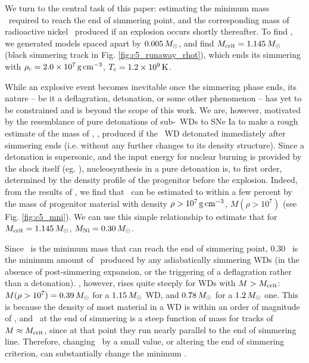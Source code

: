 We turn to the central task of this paper: estimating the minimum mass \Mcrit\ required to reach the end of simmering point, and the corresponding mass of radioactive nickel \MNi\ produced if an explosion occurs shortly thereafter.  To find \Mcrit, we generated models spaced apart by $0.005\,\Msun$, and find $\Mcrit=1.145\,\Msun$ (black simmering track in Fig. \ref{fig:c5_runaway_rhot}), which ends its simmering with $\rhoc = 2.0\times10^7\,\gcc$, $\Tc = 1.2\times10^9\,\mrm{K}$.

While an explosive event becomes inevitable once the simmering phase ends, its nature -- be it a deflagration, detonation, or some other phenomenon -- has yet to be constrained and is beyond the scope of this work.  We are, however, motivated by the resemblance of pure detonations of sub-\Mch\ WDs to SNe Ia to make a rough estimate of the mass of \Ni, \MNi, produced if the \Mcrit\ WD detonated immediately after simmering ends (i.e. without any further changes to its density structure).  Since a detonation is supersonic, and the input energy for nuclear burning is provided by the shock itself (eg. \citealt{seit+09}), nucleosynthesis in a pure detonation is, to first order, determined by the density profile of the progenitor before the explosion.  Indeed, from the results of \cite{sim+10}, we find that \MNi\ can be estimated to within a few percent by the mass of progenitor material with density $\rho>10^7\,\gcc$, $M(\rho>10^7)$ (see Fig. \ref{fig:c5_mni}).  We can use this simple relationship to estimate that for $\Mcrit = 1.145\,\Msun$, $\MNi = 0.30\,\Msun$.  

Since \Mcrit\ is the minimum mass that can reach the end of simmering point, 0.30 \Msun\ is the minimum amount of \Ni\ produced by any adiabatically simmering WDs (in the absence of post-simmering expansion, or the triggering of a deflagration rather than a detonation).  \MNi, however, rises quite steeply for WDs with $M>\Mcrit$: $M(\rho>10^7) = 0.39\,\Msun$ for a $1.15\,\Msun$ WD, and $0.78\,\Msun$ for a $1.2\,\Msun$ one.  This is because the density of most material in a WD is within an order of magnitude of \rhoc, and \rhoc\ at the end of simmering is a steep function of mass for tracks of $M \approx \Mcrit$, since at that point they run nearly parallel to the end of simmering line.  Therefore, changing \Mcrit\ by a small value, or altering the end of simmering criterion, can substantially change the minimum \MNi.


